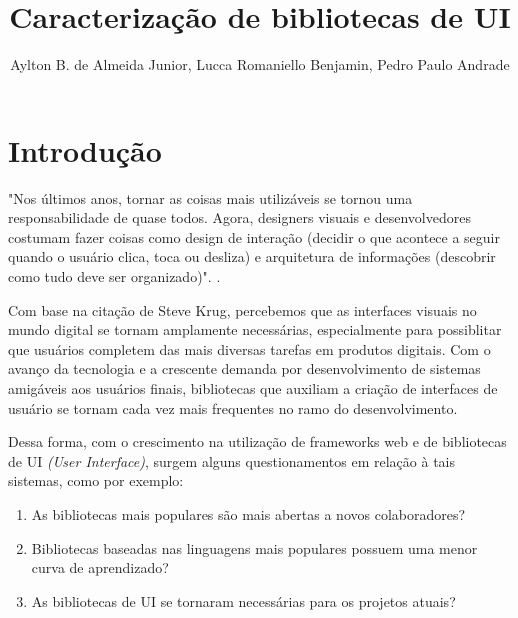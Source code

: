\documentclass[12pt]{article}
\title{Caracterização de bibliotecas de UI}
\author{Aylton B. de Almeida Junior\inst{1}, Lucca Romaniello Benjamin\inst{2}, Pedro Paulo Andrade\inst{3} }
\begin{document}
 

\maketitle

     

\section{Introdução}

"Nos últimos anos, tornar as coisas mais utilizáveis se tornou uma responsabilidade de quase todos. Agora, designers visuais e desenvolvedores costumam fazer coisas como design de interação (decidir o que acontece a seguir quando o usuário clica, toca ou desliza) e arquitetura de informações (descobrir como tudo deve ser organizado)". \cite{DONTMAKEMETHINK}.

Com base na citação de Steve Krug, percebemos que as interfaces visuais no mundo digital se tornam amplamente necessárias, especialmente para possiblitar que usuários completem das mais diversas tarefas em produtos digitais. Com o avanço da tecnologia e a crescente demanda por desenvolvimento de sistemas amigáveis aos usuários finais, bibliotecas que auxiliam a criação de interfaces de usuário se tornam cada vez mais frequentes no ramo do desenvolvimento.

Dessa forma, com o crescimento na utilização de frameworks web e de bibliotecas de UI \textit{(User Interface)}, surgem alguns questionamentos em relação à tais sistemas, como por exemplo:
\begin{enumerate}
  \item As bibliotecas mais populares são mais abertas a novos colaboradores?
  \item Bibliotecas baseadas nas linguagens mais populares possuem uma menor curva de aprendizado?
  \item As bibliotecas de UI se tornaram necessárias para os projetos atuais?
\end{enumerate}
\end{document}
